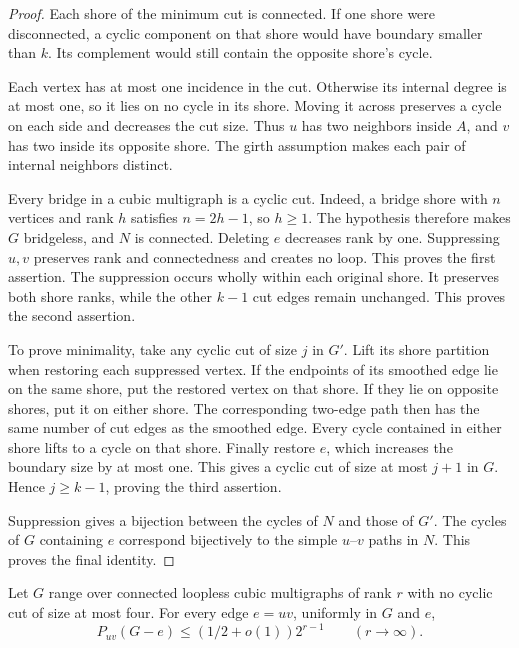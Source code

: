 \begin{proof}
Each shore of the minimum cut is connected.
If one shore were disconnected, a cyclic component on that shore would have boundary smaller than $k$.
Its complement would still contain the opposite shore's cycle.

Each vertex has at most one incidence in the cut.
Otherwise its internal degree is at most one, so it lies on no cycle in its shore.
Moving it across preserves a cycle on each side and decreases the cut size.
Thus $u$ has two neighbors inside $A$, and $v$ has two inside its opposite shore.
The girth assumption makes each pair of internal neighbors distinct.

Every bridge in a cubic multigraph is a cyclic cut.
Indeed, a bridge shore with $n$ vertices and rank $h$ satisfies $n=2h-1$, so $h\ge1$.
The hypothesis therefore makes $G$ bridgeless, and $N$ is connected.
Deleting $e$ decreases rank by one.
Suppressing $u,v$ preserves rank and connectedness and creates no loop.
This proves the first assertion.
The suppression occurs wholly within each original shore.
It preserves both shore ranks, while the other $k-1$ cut edges remain unchanged.
This proves the second assertion.

To prove minimality, take any cyclic cut of size $j$ in $G'$.
Lift its shore partition when restoring each suppressed vertex.
If the endpoints of its smoothed edge lie on the same shore, put the restored vertex on that shore.
If they lie on opposite shores, put it on either shore.
The corresponding two-edge path then has the same number of cut edges as the smoothed edge.
Every cycle contained in either shore lifts to a cycle on that shore.
Finally restore $e$, which increases the boundary size by at most one.
This gives a cyclic cut of size at most $j+1$ in $G$.
Hence $j\ge k-1$, proving the third assertion.

Suppression gives a bijection between the cycles of $N$ and those of $G'$.
The cycles of $G$ containing $e$ correspond bijectively to the simple $u$--$v$ paths in $N$.
This proves the final identity.
\end{proof}

\begin{lemma}
\label{lem:path-cut-deletion-path-bound}
Let $G$ range over connected loopless cubic multigraphs of rank $r$ with no cyclic cut of size at most four.
For every edge $e=uv$, uniformly in $G$ and $e$,
\[
 P_{uv}(G-e)\le(1/2+o(1))2^{r-1}
 \qquad(r\to\infty).
\]
\end{lemma}

